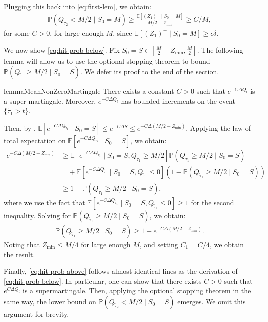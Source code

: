 \documentclass[mnsc,nonblindrev]{informs3}
\newcommand{\E}{\mathbb{E}}
\newcommand{\pr}{\mathbb{P}}
\renewcommand{\Pr}{\pr}
\newcommand{\Ttaulow}{\widetilde{\tau}_1}
\newcommand{\Ttauhigh}{\widetilde{\tau}_2}
\renewenvironment{proof}[1][Proof]{%
  \par\noindent{\itshape #1.} \ignorespaces
}{%
  \hfill\Halmos\par
}
\begin{document}
\begin{APPENDICES}
\begin{proof}
Plugging this back into \eqref{eq:first-lem}, we obtain:
\begin{align*}
\Pr\left(Q_{\Ttauhigh} < M/2 \mid S_0 = M\right) \geq \frac{\E[(Z_1)^- \mid S_0 = M]}{M/2+Z_{\min}} \geq C/M,
\end{align*}
for some $C > 0$, for large enough $M$, since $\E[(Z_1)^- \mid S_0 = M] \geq \epsilon \delta$. 

\medskip 

We now show \cref{eq:hit-prob-below}. Fix $S_0 = S \in [\frac{M}{2} - Z_{\min}, \frac{M}{2}]$. The following lemma will allow us to use the optional stopping theorem to bound $\Pr\left(Q_{\Ttaulow} \geq M/2 \mid S_0 = S\right)$. We defer its proof to the end of the section.

\begin{restatable}{lemma}{MeanNonZeroMartingale}  \label{lem:Mean_non-0_case_marginales}
    There exists a constant $C >0$ such that $e^{-C \Delta Q_t}$ is a super-martingale. Moreover, $e^{-C \Delta Q_t}$ has bounded increments on the event $\{\Ttaulow > t\}$.
\end{restatable}

Then, by , $\E\left[e^{-C\Delta Q_{\Ttaulow}} \mid S_0 = S\right] \leq e^{-C\Delta S} \leq e^{-C\Delta\left(M/2-Z_{\min}\right)}$. Applying the law of total expectation on $\E\left[e^{-C\Delta Q_{\Ttaulow}}\mid S_0 = S\right]$, we obtain:
\begin{align*}
e^{-C\Delta\left(M/2-Z_{\min}\right)} &\geq \E\left[e^{-C\Delta Q_{\Ttaulow}} \mid S_0 = S, Q_{\Ttaulow} \geq M/2\right]\Pr\left( Q_{\Ttaulow} \geq M/2 \mid S_0 = S\right)\\
&\quad + \E\left[e^{-C\Delta Q_{\Ttaulow}} \mid S_0 = S, Q_{\Ttaulow} \leq 0\right]\left(1-\Pr\left( Q_{\Ttaulow} \geq M/2 \mid S_0 = S\right)\right)\\
&\geq 1 - \Pr\left( Q_{\Ttaulow} \geq M/2 \mid S_0 = S\right),
\end{align*}
where we use the fact that $\E\left[e^{-C\Delta Q_{\Ttaulow}} \mid S_0 = S, Q_{\Ttaulow} \leq 0\right] \geq 1$ for the second inequality. Solving for $\Pr\left( Q_{\Ttaulow} \geq M/2 \mid S_0 = S\right)$, we obtain:
\begin{align*}
\Pr\left( Q_{\Ttaulow} \geq M/2 \mid S_0 = S\right) \geq 1-e^{-C\Delta (M/2-Z_{\min})}.
\end{align*}
Noting that $Z_{\min} \leq M/4$ for large enough $M$, and setting $C_1 = C/4$, we obtain the result.

Finally, \cref{eq:hit-prob-above} follows almost identical lines as the derivation of \cref{eq:hit-prob-below}. In particular, one can show that there exists $C > 0$ such that $e^{C\Delta Q_t}$ is a supermartingale. Then, applying the optional stopping theorem in the same way, the lower bound on $\Pr\left(Q_{\Ttauhigh} < M/2 \mid S_0 = S\right)$ emerges. We omit this argument for brevity.
\end{proof}


\end{APPENDICES}
\end{document}
